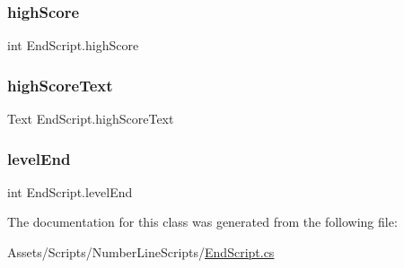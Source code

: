 \mbox{\label{classEndScript_a5f0a88d9be022990d05c377228616da1}} 
\subsubsection{\texorpdfstring{high\+Score}{highScore}}
{\footnotesize\ttfamily int End\+Script.\+high\+Score}

\mbox{\label{classEndScript_a456ea5ed341311ea55ebc6ea7560a1bc}} 
\subsubsection{\texorpdfstring{high\+Score\+Text}{highScoreText}}
{\footnotesize\ttfamily Text End\+Script.\+high\+Score\+Text}

\mbox{\label{classEndScript_aba5d706ac8abdb526399c1cca351a991}} 
\subsubsection{\texorpdfstring{level\+End}{levelEnd}}
{\footnotesize\ttfamily int End\+Script.\+level\+End\hspace{0.3cm}{\ttfamily [static]}}



The documentation for this class was generated from the following file\+:\begin{DoxyCompactItemize}
\item 
Assets/\+Scripts/\+Number\+Line\+Scripts/\hyperlink{EndScript_8cs}{End\+Script.\+cs}\end{DoxyCompactItemize}
